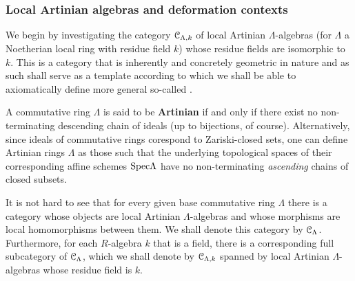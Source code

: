         \subsubsection{Local Artinian algebras and deformation contexts}
            We begin by investigating the category $\mathcal{C}_{\Lambda, k}$ of local Artinian $\Lambda$-algebras (for $\Lambda$ a Noetherian local ring with residue field $k$) whose residue fields are isomorphic to $k$. This is a category that is inherently and concretely geometric in nature and as such shall serve as a template according to which we shall be able to axiomatically define more general so-called .
            \begin{definition} \label{def: artinian_rings} 
                A commutative ring $\Lambda$ is said to be \textbf{Artinian} if and only if there exist no non-terminating descending chain of ideals (up to bijections, of course). Alternatively, since ideals of commutative rings corespond to Zariski-closed sets, one can define Artinian rings $\Lambda$ as those such that the underlying topological spaces of their corresponding affine schemes $\mathrm{Spec} \Lambda$ have no non-terminating \textit{ascending} chains of closed subsets. 
                
                It is not hard to see that for every given base commutative ring $\Lambda$ there is a category whose objects are local Artinian $\Lambda$-algebras and whose morphisms are local homomorphisms between them. We shall denote this category by $\mathcal{C}_{\Lambda}$. Furthermore, for each $R$-algebra $k$ that is a field, there is a corresponding full subcategory of $\mathcal{C}_{\Lambda}$, which we shall denote by $\mathcal{C}_{\Lambda, k}$ spanned by local Artinian $\Lambda$-algebras whose residue field is $k$. 
            \end{definition}
            

